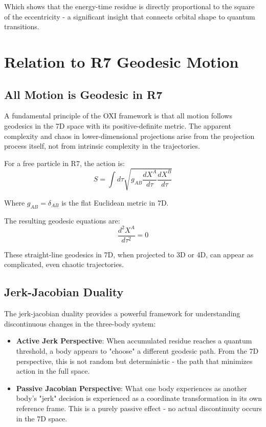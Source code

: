 \documentclass{article}
\begin{document}
Which shows that the energy-time residue is directly proportional to the square of the eccentricity - a significant insight that connects orbital shape to quantum transitions.

\section{Relation to R7 Geodesic Motion}

\subsection{All Motion is Geodesic in R7}

A fundamental principle of the OXI framework is that all motion follows geodesics in the 7D space with its positive-definite metric. The apparent complexity and chaos in lower-dimensional projections arise from the projection process itself, not from intrinsic complexity in the trajectories.

For a free particle in R7, the action is:
\begin{equation}
S = \int d\tau \sqrt{g_{AB} \frac{dX^A}{d\tau} \frac{dX^B}{d\tau}}
\end{equation}

Where $g_{AB} = \delta_{AB}$ is the flat Euclidean metric in 7D.

The resulting geodesic equations are:
\begin{equation}
\frac{d^2 X^A}{d\tau^2} = 0
\end{equation}

These straight-line geodesics in 7D, when projected to 3D or 4D, can appear as complicated, even chaotic trajectories.

\subsection{Jerk-Jacobian Duality}

The jerk-jacobian duality provides a powerful framework for understanding discontinuous changes in the three-body system:

\begin{itemize}
\item \textbf{Active Jerk Perspective}: When accumulated residue reaches a quantum threshold, a body appears to "choose" a different geodesic path. From the 7D perspective, this is not random but deterministic - the path that minimizes action in the full space.

\item \textbf{Passive Jacobian Perspective}: What one body experiences as another body's "jerk" decision is experienced as a coordinate transformation in its own reference frame. This is a purely passive effect - no actual discontinuity occurs in the 7D space.
\end{itemize}
\end{document}

